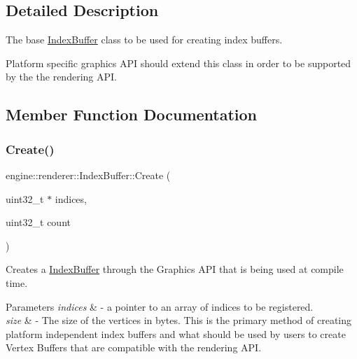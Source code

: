 \subsection{Detailed Description}
The base \hyperlink{classengine_1_1renderer_1_1IndexBuffer}{Index\+Buffer} class to be used for creating index buffers. 

Platform specific graphics A\+PI should extend this class in order to be supported by the the rendering A\+PI. 

\subsection{Member Function Documentation}
\mbox{\label{classengine_1_1renderer_1_1IndexBuffer_a2a4773cdd0dab8101ca9662ff6c0a460}} 
\subsubsection{\texorpdfstring{Create()}{Create()}}
{\footnotesize\ttfamily engine\+::renderer\+::\+Index\+Buffer\+::\+Create (\begin{DoxyParamCaption}\item[{uint32\+\_\+t $\ast$}]{indices,  }\item[{uint32\+\_\+t}]{count }\end{DoxyParamCaption})\hspace{0.3cm}{\ttfamily [static]}}



Creates a \hyperlink{classengine_1_1renderer_1_1IndexBuffer}{Index\+Buffer} through the Graphics A\+PI that is being used at compile time. 


\begin{DoxyParams}{Parameters}
{\em indices} & -\/ a pointer to an array of indices to be registered. \\
\hline
{\em size} & -\/ The size of the vertices in bytes. This is the primary method of creating platform independent index buffers and what should be used by users to create Vertex Buffers that are compatible with the rendering A\+PI. \\
\hline
\end{DoxyParams}
\mbox{\label{classengine_1_1renderer_1_1IndexBuffer_a8fd1ab43d3963533370c4d8e2e2282f4}} 

